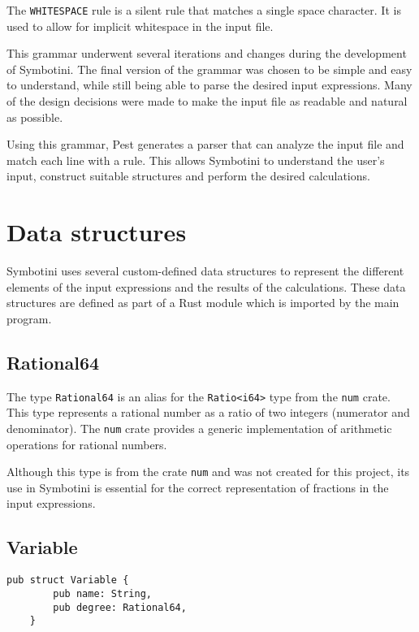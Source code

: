 The \verb|WHITESPACE| rule is a silent rule that matches a single space character. It is used to allow for implicit whitespace in the input file.

This grammar underwent several iterations and changes during the development of Symbotini. The final version of the grammar was chosen to be simple and easy to understand, while still being able to parse the desired input expressions. Many of the design decisions were made to make the input file as readable and natural as possible.

Using this grammar, Pest generates a parser that can analyze the input file and match each line with a rule. This allows Symbotini to understand the user's input, construct suitable structures and perform the desired calculations.

\section{Data structures}\label{sec:data-structures}

Symbotini uses several custom-defined data structures to represent the different elements of the input expressions and the results of the calculations. These data structures are defined as part of a Rust module which is imported by the main program.

\subsection{Rational64}\label{subsec:ratio64}

The type \verb|Rational64| is an alias for the \verb|Ratio<i64>| type from the \verb|num| crate. This type represents a rational number as a ratio of two integers (numerator and denominator). The \verb|num| crate provides a generic implementation of arithmetic operations for rational numbers.

Although this type is from the crate \verb|num| and was not created for this project, its use in Symbotini is essential for the correct representation of fractions in the input expressions.

\subsection{Variable}\label{subsec:variable}

\begin{lstlisting}[caption={The \texttt{Variable} struct}, label={lst:variable}]
    pub struct Variable {
        pub name: String,
        pub degree: Rational64,
    }
\end{lstlisting}

